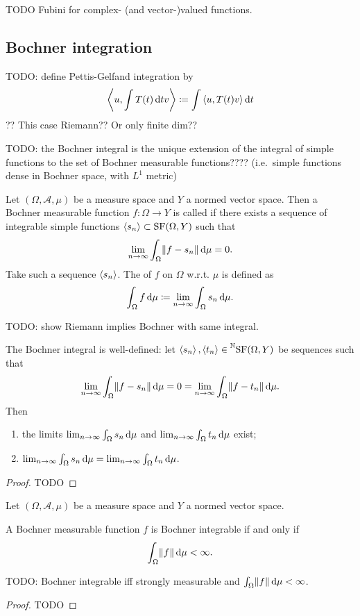 TODO Fubini for complex- (and vector-)valued functions.

\subsection{Bochner integration}
TODO: define Pettis-Gelfand integration by
\[ \inner{u, \int T(t)\diff{t} v} \defeq \int\inner{u,T(t)v}\diff{t} \]
??
This case Riemann?? Or only finite dim??



TODO: the Bochner integral is the unique extension of the integral of simple functions to the set of Bochner measurable functions???? (i.e.\ simple functions dense in Bochner space, with $L^1$ metric)
\begin{definition}
Let $(\Omega, \mathcal{A},\mu)$ be a measure space and $Y$ a normed vector space. Then a Bochner measurable function $f:\Omega\to Y$ is called  if there exists a sequence of integrable simple functions $\left\langle s_n \right\rangle\subset\operatorname{SF}(\Omega,Y)$ such that
\[ \lim_{n\to\infty}\int_\Omega \lVert f-s_n\rVert\operatorname{d \!}{\mu} = 0. \]
Take such a sequence $\left\langle s_n \right\rangle$. The  of $f$ on $\Omega$ w.r.t. $\mu$ is defined as
\[ \int_\Omega f\operatorname{d \!}{\mu} \coloneqq \lim_{n\to\infty}\int_\Omega s_n\operatorname{d \!}{\mu}. \]
\end{definition}

TODO: show Riemann implies Bochner with same integral.

\begin{lemma}
The Bochner integral is well-defined: let $\left\langle s_n \right\rangle,\left\langle t_n \right\rangle\in \prescript{\mathbb{N}}{}{\operatorname{SF}(\Omega,Y)}$ be sequences such that
\[ \lim_{n\to\infty}\int_\Omega \lVert f-s_n\rVert\operatorname{d \!}{\mu} = 0 = \lim_{n\to\infty}\int_\Omega \lVert f-t_n\rVert\operatorname{d \!}{\mu}.  \]
Then
\begin{enumerate}
\item the limits $\lim_{n\to\infty}\int_\Omega s_n\operatorname{d \!}{\mu}$ and $\lim_{n\to\infty}\int_\Omega t_n\operatorname{d \!}{\mu}$ exist;
\item $\lim_{n\to\infty}\int_\Omega s_n\operatorname{d \!}{\mu} = \lim_{n\to\infty}\int_\Omega t_n\operatorname{d \!}{\mu}$.
\end{enumerate}
\end{lemma}
\begin{proof}
TODO
\end{proof}

\begin{proposition} \label{BochnerIntegrabilityCondition}
Let $(\Omega, \mathcal{A},\mu)$ be a measure space and $Y$ a normed vector space.

A Bochner measurable function $f$ is Bochner integrable \textup{if and only if}
\[ \int_\Omega \lVert f\rVert \operatorname{d \!}{\mu} < \infty. \]
\end{proposition}
TODO: Bochner integrable iff strongly measurable and $\int_\Omega \lVert f\rVert \operatorname{d \!}{\mu} < \infty$.
\begin{proof}
TODO
\end{proof}

